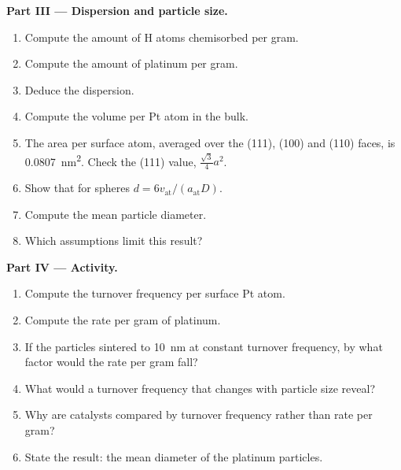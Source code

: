 \begin{problem}
\medskip\noindent\textbf{Part III --- Dispersion and particle size.}
\begin{enumerate}[resume]
  \item Compute the amount of H atoms chemisorbed per gram.
  \item Compute the amount of platinum per gram.
  \item Deduce the dispersion.
  \item Compute the volume per Pt atom in the bulk.
  \item The area per surface atom, averaged over the (111), (100) and (110)
        faces, is \qty{0.0807}{nm^2}. Check the (111) value, $\frac{\sqrt3}{4}a^2$.
  \item Show that for spheres $d = 6v_{\mathrm{at}}/(a_{\mathrm{at}}D)$.
  \item Compute the mean particle diameter.
  \item Which assumptions limit this result?
\end{enumerate}

\medskip\noindent\textbf{Part IV --- Activity.}
\begin{enumerate}[resume]
  \item Compute the turnover frequency per surface Pt atom.
  \item Compute the rate per gram of platinum.
  \item If the particles sintered to \qty{10}{nm} at constant turnover frequency, by what
        factor would the rate per gram fall?
  \item What would a turnover frequency that changes with particle size reveal?
  \item Why are catalysts compared by turnover frequency rather than rate per
        gram?
  \item State the result: the mean diameter of the platinum particles.
\end{enumerate}
\end{problem}
